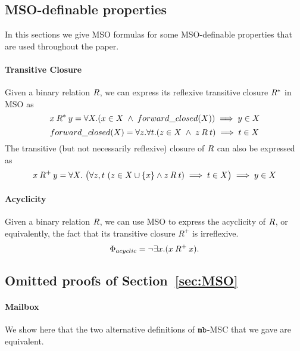 
\subsection{MSO-definable properties}

In this sections we give MSO formulas for some MSO-definable properties that are used throughout the paper.

\paragraph*{Transitive Closure}
Given a binary relation $\mathbin{R}$, we can express its reflexive transitive closure $\mathbin{R}^*$ in MSO as
\[
x \mathbin{R}^* y = \forall X.(x \in X \;\wedge\; forward\_closed(X)) \implies y \in X
\]
\[
forward\_closed(X) = \forall z.\forall t.(z \in X \;\wedge\; z \mathbin{R} t) \implies t \in X
\]
The transitive (but not necessarily reflexive) 
closure of $\mathbin{R}$ can also be expressed as
\[
    x \mathbin{R}^+ y = \forall X.\ \big(
        \forall z,t\ (z\in X\cup\{x\}\wedge z \mathbin{R} t)\implies t \in X\big) \implies y\in X
\]
        
\paragraph*{Acyclicity} 

Given a binary relation $\mathbin{R}$, we can use MSO to express the 
acyclicity of $\mathbin{R}$,
or equivalently, the fact that its transitive closure
$R^+$ is irreflexive.
\[
\Phi_{acyclic} =  \neg \exists x.(x \mathbin{R}^+ x).   
\]

\subsection{Omitted proofs of Section~\ref{sec:MSO}}\label{app:sec-mso}

\paragraph*{\bf Mailbox}

We show here that the two alternative definitions of $\mathtt{mb}$-MSC that we gave are equivalent.

